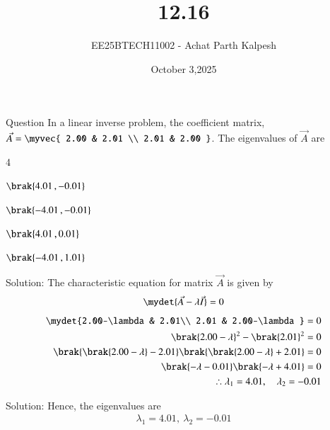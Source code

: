 \documentclass{beamer}
\title %
{12.16}
\date{October 3,2025}
\author %
{EE25BTECH11002 - Achat Parth Kalpesh}
\begin{document}
\frame{\titlepage}

\begin{frame}{Question}
In a linear inverse problem, the coefficient matrix, $\vec{A} = \myvec{ 2.00 & 2.01 \\ 2.01 & 2.00 }$.
 The eigenvalues of $\vec{A}$ are
  \begin{enumerate}
   \begin{multicols}{4}
   \item $\brak{4.01\,, -0.01}$
   \item $\brak{-4.01\,,-0.01}$
   \item $\brak{4.01\,,0.01}$
   \item $\brak{-4.01\,,1.01}$
   \end{multicols}
   \end{enumerate}
\end{frame}

\begin{frame}{Solution:}
The characteristic equation for matrix $\vec{A}$ is given by
\begin{align}
    \mydet{\vec{A} - \lambda\vec{I}} = 0
\end{align}
\begin{align}
    \mydet{2.00-\lambda & 2.01\\ 2.01 & 2.00-\lambda} = 0\\
     \brak{2.00-\lambda}^2 - \brak{2.01}^2 = 0\\
     \brak{\brak{2.00-\lambda} - 2.01}\brak{\brak{2.00-\lambda} + 2.01} = 0\\
     \brak{-\lambda - 0.01}\brak{-\lambda + 4.01} = 0\\
     \therefore \lambda_1 = 4.01,\quad \lambda_2 = -0.01\\
\end{align}
\end{frame}

\begin{frame}{Solution:}
Hence, the eigenvalues are
\begin{align}
    \lambda_1 = 4.01,\ \lambda_2 = -0.01
\end{align}
\end{frame}
\end{document}

